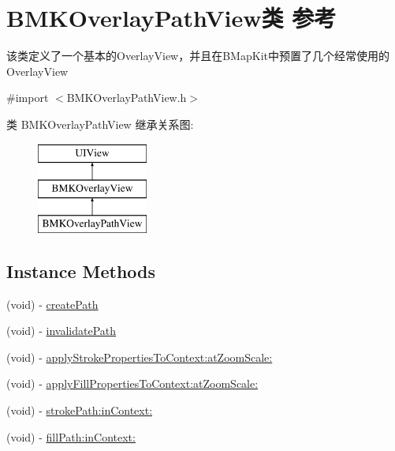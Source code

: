 \hypertarget{interface_b_m_k_overlay_path_view}{}\section{B\+M\+K\+Overlay\+Path\+View类 参考}
\label{interface_b_m_k_overlay_path_view}


该类定义了一个基本的\+Overlay\+View，并且在\+B\+Map\+Kit中预置了几个经常使用的\+Overlay\+View  




{\ttfamily \#import $<$B\+M\+K\+Overlay\+Path\+View.\+h$>$}

类 B\+M\+K\+Overlay\+Path\+View 继承关系图\+:\begin{figure}[H]
\begin{center}
\leavevmode
\includegraphics[height=3.000000cm]{interface_b_m_k_overlay_path_view}
\end{center}
\end{figure}
\subsection*{Instance Methods}
\begin{DoxyCompactItemize}
\item 
(void) -\/ \hyperlink{interface_b_m_k_overlay_path_view_a4e76c3b9524b555c2118ae18f6057605}{create\+Path}
\item 
(void) -\/ \hyperlink{interface_b_m_k_overlay_path_view_ac773bae0823405dcf5b78a3361fa2d56}{invalidate\+Path}
\item 
(void) -\/ \hyperlink{interface_b_m_k_overlay_path_view_a2acbf6bd9401c2904148b7b6cf85c6e9}{apply\+Stroke\+Properties\+To\+Context\+:at\+Zoom\+Scale\+:}
\item 
(void) -\/ \hyperlink{interface_b_m_k_overlay_path_view_af549bea37a94164a088826f9a962e08c}{apply\+Fill\+Properties\+To\+Context\+:at\+Zoom\+Scale\+:}
\item 
(void) -\/ \hyperlink{interface_b_m_k_overlay_path_view_a482e5fe24f04335d090b32d449ef6dc4}{stroke\+Path\+:in\+Context\+:}
\item 
(void) -\/ \hyperlink{interface_b_m_k_overlay_path_view_a036abde24b9ae921f209cde884dad49b}{fill\+Path\+:in\+Context\+:}
\end{DoxyCompactItemize}
